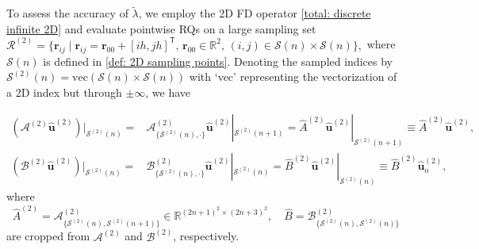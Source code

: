 \documentclass[11pt]{article}
\def\r{\mathbf{r}}
\def\u{\mathbf{u}}
\numberwithin{equation}{section}
\begin{document}
To assess the accuracy of $\widetilde{\lambda}$, we employ the 2D FD operator \eqref{total: discrete infinite 2D} and evaluate pointwise RQs on a large sampling set $\mathcal{R}^{(2)} = \{ \mathbf{r}_{ij} \mid \mathbf{r}_{ij} = \mathbf{r}_{00} + [ih, jh]^\mathsf{T},\, \r_{00}\in\mathbb{R}^2, \, (i,j) \in \mathcal{S}(n) \times \mathcal{S}(n)\},$ where $ \mathcal{S}(n) $ is defined in \eqref{def: 2D sampling points}. Denoting the sampled indices by $\mathcal{S}^{(2)}(n) = \text{vec}( \mathcal{S}(n) \times \mathcal{S}(n))$ with `vec' representing the vectorization of a 2D index but through $\pm \infty$, we have

\begin{subequations} \label{total: finite matrix derive 4D}
    \begin{align}
        (\mathcal{A}^{(2)}\widehat{\boldsymbol{u}}^{(2)} )|_{\mathcal{S}^{(2)}(n)}
        =&
        \mathcal{A}^{(2)}_{\{\mathcal{S}^{(2)}(n),\cdot\}}\widehat{\boldsymbol{u}}^{(2)}|_{\mathcal{S}^{(2)}(n+1)}
        =\widehat{A}^{(2)}\widehat{\boldsymbol{u}}^{(2)}|_{\mathcal{S}^{(2)}(n+1)} \equiv \widehat{A}^{(2)}\widehat{\u}^{(2)}, \label{dv: matrixA 4D}\\
        (\mathcal{B}^{(2)}\widehat{\boldsymbol{u}}^{(2)} )|_{\mathcal{S}^{(2)}(n)}
        =& \mathcal{B}^{(2)}_{\{\mathcal{S}^{(2)}(n),\cdot\}}\widehat{\boldsymbol{u}}^{(2)}|_{\mathcal{S}^{(2)}(n)}
        =\widehat{B}^{(2)}\widehat{\boldsymbol{u}}^{(2)}|_{\mathcal{S}^{(2)}(n)}\equiv \widehat{B}^{(2)}\widehat{\u}_{\mathrm{o}}^{(2)},\label{dv: matrixB 4D}
    \end{align}
\end{subequations}
where
\begin{equation} \label{df: matrices of 4D}
    \widehat{A}^{(2)} = \mathcal{A}^{(2)}_{\{\mathcal{S}^{(2)}(n), \mathcal{S}^{(2)}(n+1)\}} \in \mathbb{R}^{(2n+1)^2 \times (2n+3)^2},
\quad
\widehat{B} = \mathcal{B}^{(2)}_{\{\mathcal{S}^{(2)}(n),\mathcal{S}^{(2)}(n)\}}
\end{equation}
are cropped from $\mathcal{A}^{(2)}$ and $\mathcal{B}^{(2)}$, respectively.
\end{document}
